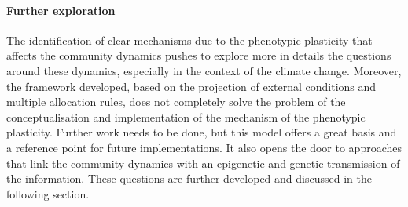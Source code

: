 \paragraph{Further exploration}

The identification of clear mechanisms due to the phenotypic plasticity that affects the community dynamics pushes to explore more in details the questions around these dynamics, especially in the context of the climate change. Moreover, the framework developed, based on the projection of external conditions and multiple allocation rules, does not completely solve the problem of the conceptualisation and implementation of the mechanism of the phenotypic plasticity. Further work needs to be done, but this model offers a great basis and a reference point for future implementations. It also opens the door to approaches that link the community dynamics with an epigenetic and genetic transmission of the information. These questions are further developed and discussed in the following section.



